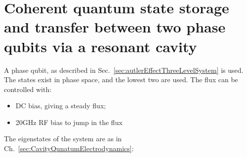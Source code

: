 \section{Coherent quantum state storage and transfer between two phase qubits via a resonant cavity \label{sec:coherentStateStorageBetweenPhaseQubits}}
	A phase qubit, as described in Sec.~\ref{sec:autlerEffectThreeLevelSystem} is used. The states exist in phase space, and the lowest two are used. The flux can be controlled with:
	\begin{itemize}
		\item DC bias, giving a steady flux;
		\item 20GHz RF bias to jump in the flux
	\end{itemize}
		 	 
		 	
	The eigenstates of the system are as in Ch.~\ref{sec:CavityQunatumElectrodynamics}:
	
	 \iframe{
		\[
		\begin{aligned}
		\iket{+,N} & = U^{\dagger}\ket{\tilde{1}} 				= \bigg(\cos(\theta/2)\mathbb{I}-i\sin(\theta/2)\sigma_y\bigg)
		\begin{pmatrix}1\\0 \end{pmatrix} = 
		\begin{pmatrix} \cos(\theta/2)\\\sin(\theta/2)\end{pmatrix} \\
		\iket{-,N} & = U^{\dagger}\ket{\tilde{0}} = \begin{pmatrix}
		-\sin(\theta/2)\\\cos(\theta/2)
		\end{pmatrix} \equiv -\sin(\theta/2)\iket{\uparrow,N} + \cos(\theta/2)\iket{\downarrow,N+1}\\
		\\
		 \mathcal{H}_{\text{middle}} 
		& = \kbordermatrix{&\ket{\uparrow,N} & \ket{\downarrow,N+1}\\
			\bra{\uparrow,N} & \blue{\hbar\omega_r(N+\frac{1}{2}) + \hbar\Delta} & \red{g_0\sqrt{N+1}}\\
			\bra{\downarrow,N+1} & \red{g_0\sqrt{N+1}} & \blue{\hbar\omega_r(N+\frac{1}{2}) - \hbar\Delta}}
		\quad \text{E}_{\pm} = \hbar\omega_r(N+\frac{1}{2}) \pm \frac{E_\text{coupled}}{2}
		\end{aligned}
	\]}
	  
